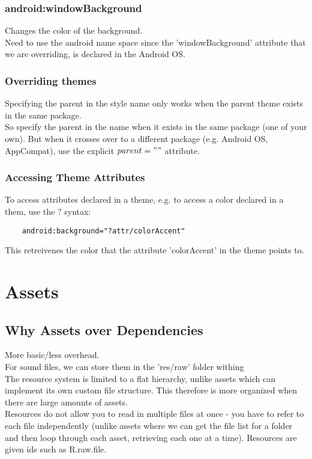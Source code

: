 \documentclass[]{article}
\begin{document}
\subsubsection{android:windowBackground}
Changes the color of the background.
\\
Need to use the android name space since the 'windowBackground' attribute that we are overriding, is declared in the Android OS.

\subsubsection{Overriding themes}
Specifying the parent in the style name only works when the parent theme exists in the same package.
\\
So specify the parent in the name when it exists in the same package (one of your own).  But when it crosses over to a different package (e.g. Android OS, AppCompat), use the explicit $ parent="" $ attribute.

\subsubsection{Accessing Theme Attributes}
To access attributes declared in a theme, e.g. to access a color declared in a them, use the $ ? $ syntax:
\begin{lstlisting}
	android:background="?attr/colorAccent"
\end{lstlisting}
This retreivenes the color that the attribute 'colorAccent' in the theme points to.

\section{Assets}
\subsection{Why Assets over Dependencies}
More basic/less overhead.
\\
For sound files, we can store them in the 'res/raw' folder withing 
\\
The resource system is limited to a flat hierarchy, unlike assets which can implement its own custom file structure.  This therefore is more organized when there are large amounts of assets.
\\
Resources do not allow you to read in multiple files at once - you have to refer to each file independently (unlike assets where we can get the file list for a folder and then  loop through each asset, retrieving each one at a time).  Resources are given ids such as R.raw.file.
\end{document}
